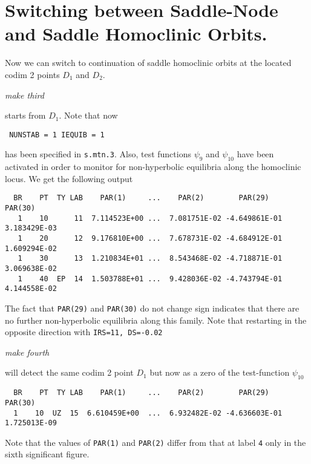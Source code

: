 \documentclass[12pt]{report}
\begin{document}
\section{Switching between Saddle-Node and Saddle Homoclinic Orbits.}
Now we can switch to continuation of saddle homoclinic orbits at the
located codim 2 points $D_1$ and $D_2$. 
\begin{center}
{\it make third}
\end{center}
starts from $D_1$. Note that now 
\begin{center}
{\tt 
NUNSTAB = 1 \quad IEQUIB = 1}  
\end{center}
has been specified in {\tt s.mtn.3}. Also, test functions $\psi_9$
and $\psi_{10}$ have been activated in order
to monitor for non-hyperbolic equilibria along the homoclinic locus. 
We get the following output
\begin{verbatim}
  BR    PT  TY LAB    PAR(1)     ...    PAR(2)        PAR(29)       PAR(30)    
   1    10      11  7.114523E+00 ...  7.081751E-02 -4.649861E-01  3.183429E-03
   1    20      12  9.176810E+00 ...  7.678731E-02 -4.684912E-01  1.609294E-02
   1    30      13  1.210834E+01 ...  8.543468E-02 -4.718871E-01  3.069638E-02
   1    40  EP  14  1.503788E+01 ...  9.428036E-02 -4.743794E-01  4.144558E-02
\end{verbatim}
The fact that {\tt PAR(29)} and {\tt PAR(30)} do not change sign indicates 
that there are no further non-hyperbolic equilibria
along this family. Note that restarting in the opposite direction with {\tt IRS=11,
DS=-0.02} 
\begin{center}
{\it make fourth}
\end{center}
will detect the same codim 2 point $D_1$ but now as a zero
of the test-function $\psi_{10}$
\begin{verbatim}
  BR    PT  TY LAB    PAR(1)     ...    PAR(2)        PAR(29)       PAR(30)
  1    10  UZ  15  6.610459E+00  ...  6.932482E-02 -4.636603E-01  1.725013E-09    
\end{verbatim}
Note that the values of {\tt PAR(1)} and {\tt PAR(2)} differ from that at label {\tt 4} 
only in the sixth significant figure. 
\end{document}
